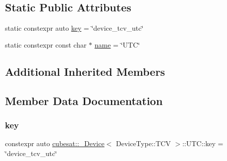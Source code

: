 \subsection*{Static Public Attributes}
\begin{DoxyCompactItemize}
\item 
static constexpr auto \hyperlink{structcubesat_1_1__Device_3_01DeviceType_1_1TCV_01_4_1_1UTC_aaa3c91d4038277d831d8ab7df9c0b4e4}{key} = \char`\"{}device\+\_\+tcv\+\_\+utc\char`\"{}
\item 
static constexpr const char $\ast$ \hyperlink{structcubesat_1_1__Device_3_01DeviceType_1_1TCV_01_4_1_1UTC_a5f6c4394a09539ab28b3079b7f4c0fce}{name} = \char`\"{}U\+TC\char`\"{}
\end{DoxyCompactItemize}
\subsection*{Additional Inherited Members}


\subsection{Member Data Documentation}
\mbox{\label{structcubesat_1_1__Device_3_01DeviceType_1_1TCV_01_4_1_1UTC_aaa3c91d4038277d831d8ab7df9c0b4e4}} 
\subsubsection{\texorpdfstring{key}{key}}
{\footnotesize\ttfamily constexpr auto \hyperlink{structcubesat_1_1__Device}{cubesat\+::\+\_\+\+Device}$<$ Device\+Type\+::\+T\+CV $>$\+::U\+T\+C\+::key = \char`\"{}device\+\_\+tcv\+\_\+utc\char`\"{}\hspace{0.3cm}{\ttfamily [static]}}

\mbox{\label{structcubesat_1_1__Device_3_01DeviceType_1_1TCV_01_4_1_1UTC_a5f6c4394a09539ab28b3079b7f4c0fce}} 
